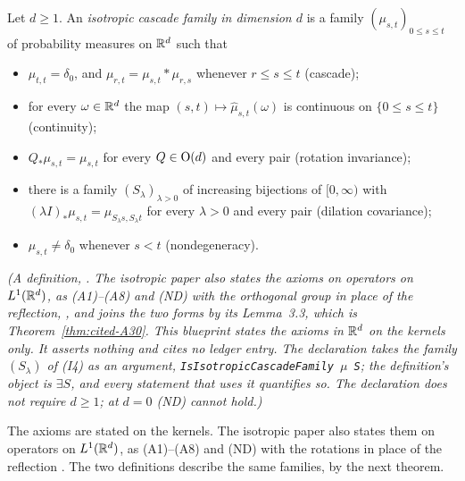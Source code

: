\begin{definition}
\label{def:isotropic-cascade-family}
\leanok
Let $d \ge 1$. An \emph{isotropic cascade family in dimension $d$} is a family
$(\mu_{s,t})_{0 \le s \le t}$ of probability measures on $\mathbb{R}^d$ such that
\begin{itemize}
\item[(I1)] $\mu_{t,t} = \delta_0$, and $\mu_{r,t} = \mu_{s,t} * \mu_{r,s}$ whenever
$r \le s \le t$ (cascade);
\item[(I2)] for every $\omega \in \mathbb{R}^d$ the map $(s,t) \mapsto \widehat\mu_{s,t}(\omega)$ is
continuous on $\{0 \le s \le t\}$ (continuity);
\item[(I3)] $Q_*\mu_{s,t} = \mu_{s,t}$ for every $Q \in \mathrm{O}(d)$ and every pair (rotation
invariance);
\item[(I4)] there is a family $(S_\lambda)_{\lambda > 0}$ of increasing bijections of
$[0,\infty)$ with $(\lambda I)_*\mu_{s,t} = \mu_{S_\lambda s, S_\lambda t}$ for every $\lambda > 0$
and every pair (dilation covariance);
\item[(ND)] $\mu_{s,t} \ne \delta_0$ whenever $s < t$ (nondegeneracy).
\end{itemize}
\statusT\quad\emph{(A definition,
. The isotropic paper also
states the axioms on operators on $L^1(\mathbb{R}^d)$, as (A1)--(A8) and (ND) with the orthogonal group in
place of the reflection, , and joins the two forms by its
Lemma~3.3, which is Theorem~\ref{thm:cited-A30}. This blueprint states the axioms in $\mathbb{R}^d$ on the kernels
only. It asserts nothing and cites no ledger entry. The declaration takes the family
$(S_\lambda)$ of (I4) as an argument, \texttt{IsIsotropicCascadeFamily $\mu$ S}; the definition's
object is $\exists S$, and every statement that uses it quantifies so. The declaration does not require
$d \ge 1$; at $d = 0$ (ND) cannot hold.)}
\end{definition}

The axioms are stated on the kernels. The isotropic paper also states them on operators on
$L^1(\mathbb{R}^d)$, as (A1)--(A8) and (ND) with the rotations in place of the reflection
. The two definitions describe the same families, by the
next theorem.

